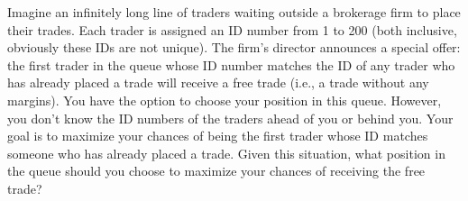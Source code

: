 \begin{que}
	Imagine an infinitely long line of traders waiting outside a brokerage firm to
	place their trades. Each trader is assigned an ID number from 1 to 200 (both
	inclusive, obviously these IDs are not unique). The firm’s director announces
	a special offer: the first trader in the queue whose ID number matches the ID
	of any trader who has already placed a trade will receive a free trade (i.e.,
	a trade without any margins). You have the option to choose your position in
	this queue.   However, you don’t know the ID numbers of the traders ahead of
	you or behind you. Your goal is to maximize your chances of being the first
	trader whose ID matches someone who has already placed a trade. Given this
	situation, what position in the queue should you choose to maximize your
	chances of receiving the free trade?
\end{que}

